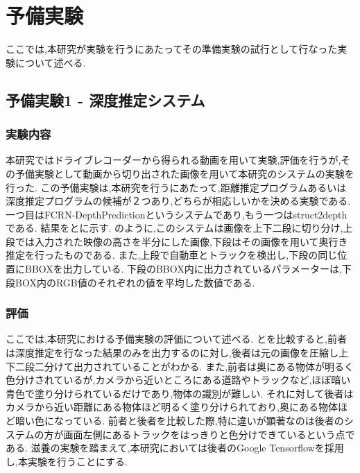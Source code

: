 \chapter{予備実験}
ここでは,本研究が実験を行うにあたってその準備実験の試行として行なった実験について述べる.
\section{予備実験1 - 深度推定システム}
\subsection{実験内容}
本研究ではドライブレコーダーから得られる動画を用いて実験,評価を行うが,その予備実験として動画から切り出された画像を用いて本研究のシステムの実験を行った.
この予備実験は,本研究を行うにあたって,距離推定プログラムあるいは深度推定プログラムの候補が２つあり,どちらが相応しいかを決める実験である.
一つ目はFCRN-DepthPrediction\cite{laina2016deeper}というシステムであり,もう一つはstruct2depthである.
結果をとに示す.
のように,このシステムは画像を上下二段に切り分け,上段では入力された映像の高さを半分にした画像,下段はその画像を用いて奥行き推定を行ったものである.
また,上段で自動車とトラックを検出し,下段の同じ位置にBBOXを出力している.
下段のBBOX内に出力されているパラメーターは,下段BOX内のRGB値のそれぞれの値を平均した数値である.

\subsection{評価}
ここでは,本研究における予備実験の評価について述べる.
とを比較すると,前者は深度推定を行なった結果のみを出力するのに対し,後者は元の画像を圧縮し上下二段二分けて出力されていることがわかる.
また,前者は奥にある物体が明るく色分けされているが,カメラから近いところにある道路やトラックなど,ほぼ暗い青色で塗り分けられているだけであり,物体の識別が難しい.
それに対して後者はカメラから近い距離にある物体ほど明るく塗り分けられており,奥にある物体ほど暗い色になっている.
前者と後者を比較した際,特に違いが顕著なのは後者のシステムの方が画面左側にあるトラックをはっきりと色分けできているという点である.
滋養の実験を踏まえて,本研究においては後者のGoogle Tensorflowを採用し,本実験を行うことにする.

